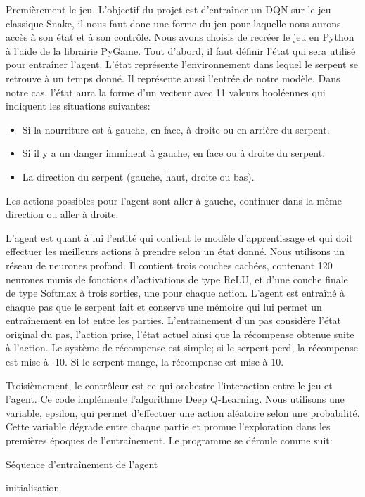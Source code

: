 \documentclass{article}
\begin{document}
Premièrement le jeu. L’objectif du projet est d’entraîner un DQN sur le jeu classique Snake, il nous faut donc une forme du jeu pour laquelle nous aurons accès à son état et à son contrôle. Nous avons choisis de recréer le jeu en Python à l’aide de la librairie PyGame. Tout d'abord, il faut définir l’état qui sera utilisé pour entraîner l’agent. L’état représente l’environnement dans lequel le serpent se retrouve à un temps donné. Il représente aussi l’entrée de notre modèle. Dans notre cas, l’état aura la forme d’un vecteur avec 11 valeurs booléennes qui indiquent les situations suivantes:

\begin{itemize}
	\item Si la nourriture est à gauche, en face, à droite ou en arrière du serpent.
	\item Si il y a un danger imminent à gauche, en face ou à droite du serpent.
	\item La direction du serpent (gauche, haut, droite ou bas).
\end{itemize}

Les actions possibles pour l'agent sont aller à gauche, continuer dans la même direction ou aller à droite.

L’agent est quant à lui l’entité qui contient le modèle d’apprentissage et qui doit effectuer les meilleurs actions à prendre selon un état donné. Nous utilisons un réseau de neurones profond. Il contient trois couches cachées, contenant 120 neurones munis de fonctions d'activations de type ReLU, et d’une couche finale de type Softmax à trois sorties, une pour chaque action. L’agent est entraîné à chaque pas que le serpent fait et conserve une mémoire qui lui permet un entraînement en lot entre les parties. L’entrainement d’un pas considère l’état original du pas, l’action prise, l’état actuel ainsi que la récompense obtenue suite à l’action. Le système de récompense est simple; si le serpent perd, la récompense est mise à -10. Si le serpent mange, la récompense est mise à 10.

Troisièmement, le contrôleur est ce qui orchestre l'interaction entre le jeu et l’agent. Ce code implémente l’algorithme Deep Q-Learning. Nous utilisons une variable, epsilon, qui permet d’effectuer une action aléatoire selon une probabilité. Cette variable dégrade entre chaque partie et promue l’exploration dans les premières époques de l’entraînement. Le programme se déroule comme suit:

\begin{algorithm}
\caption{Séquence d'entraînement de l'agent}
initialisation\;
\end{algorithm}
\end{document}
